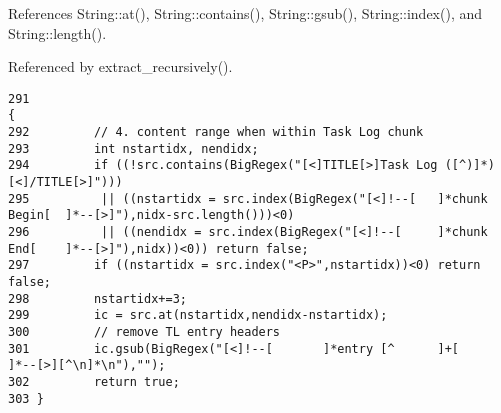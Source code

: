 References String::at(), String::contains(), String::gsub(), String::index(), and String::length().

Referenced by extract\_\-recursively().



\footnotesize\begin{verbatim}291                                                                        {
292         // 4. content range when within Task Log chunk
293         int nstartidx, nendidx;
294         if ((!src.contains(BigRegex("[<]TITLE[>]Task Log ([^)]*)[<]/TITLE[>]")))
295          || ((nstartidx = src.index(BigRegex("[<]!--[   ]*chunk Begin[  ]*--[>]"),nidx-src.length()))<0)
296          || ((nendidx = src.index(BigRegex("[<]!--[     ]*chunk End[    ]*--[>]"),nidx))<0)) return false;
297         if ((nstartidx = src.index("<P>",nstartidx))<0) return false;
298         nstartidx+=3;
299         ic = src.at(nstartidx,nendidx-nstartidx);
300         // remove TL entry headers
301         ic.gsub(BigRegex("[<]!--[       ]*entry [^      ]+[     ]*--[>][^\n]*\n"),"");
302         return true;
303 }
\end{verbatim}\normalsize 
